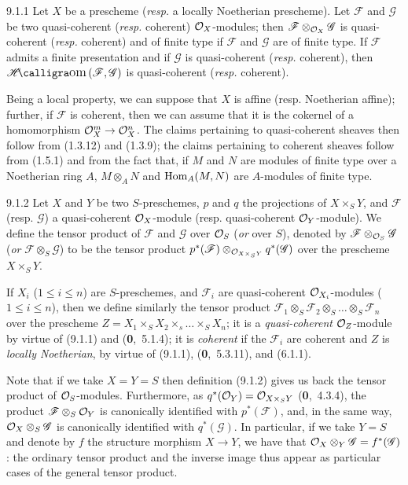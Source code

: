 \documentclass[../main.tex]{subfiles}
\begin{document}
\begin{cx}[Proposition]{9.1.1}
    Let $X$ be a prescheme (\emph{resp.} a locally Noetherian prescheme).
    Let $\mathscr{F}$ and $\mathscr{G}$ be two quasi-coherent (\emph{resp.} coherent) $\mathcal{O}_X$-modules; then $\mathscr{F}\otimes_{\mathcal{O}_X}\mathscr{G}$ is quasi-coherent (\emph{resp.} coherent) and of finite type if $\mathscr{F}$ and $\mathscr{G}$ are of finite type.
    If $\mathscr{F}$ admits a finite presentation and if $\mathscr{G}$ is quasi-coherent (\emph{resp.} coherent), then $\sheafHom(\mathscr{F},\mathscr{G})$ is quasi-coherent (\emph{resp.} coherent).
\end{cx}

Being a local property, we can suppose that $X$ is affine (resp. Noetherian affine); further, if $\mathscr{F}$ is coherent, then we can assume that it is the cokernel of a homomorphism $\mathcal{O}_X^m\to\mathcal{O}_X^n$.
The claims pertaining to quasi-coherent sheaves then follow from (1.3.12) and (1.3.9); the claims pertaining to coherent sheaves follow from (1.5.1) and from the fact that, if $M$ and $N$ are modules of finite type over a Noetherian ring $A$, $M\otimes_A N$ and $\operatorname*{Hom}_A(M,N)$ are $A$-modules of finite type.

\begin{cx}[Definition]{9.1.2}
    Let $X$ and $Y$ be two $S$-preschemes, $p$ and $q$ the projections of $X\times_S Y$, and $\mathscr{F}$ (resp. $\mathscr{G}$) a quasi-coherent $\mathcal{O}_X$-module (resp. quasi-coherent $\mathcal{O}_Y$-module).
    We define the tensor product of $\mathscr{F}$ and $\mathscr{G}$ over $\mathcal{O}_S$ (\emph{or} over $S$), denoted by $\mathscr{F}\otimes_{\mathcal{O}_S}\mathscr{G}$ (\emph{or} $\mathscr{F}\otimes_S\mathscr{G}$) to be the tensor product $p^*(\mathscr{F})\otimes_{\mathcal{O}_{X\times_S Y}}q^*(\mathscr{G})$ over the prescheme $X\times_S Y$.
\end{cx}

If $X_i$ ($1\leqslant i\leqslant n$) are $S$-preschemes, and $\mathscr{F}_i$ are quasi-coherent $\mathcal{O}_{X_i}$-modules ($1\leqslant i\leqslant n$), then we define similarly the tensor product $\mathscr{F}_1\otimes_S\mathscr{F}_2\otimes_S\ldots\otimes_S\mathscr{F}_n$ over the prescheme $Z=X_1\times_S X_2\times_s\ldots\times_S X_n$; it is a \emph{quasi-coherent} $\mathcal{O}_Z$-module by virtue of (9.1.1) and (\textbf{0},~5.1.4); it is \emph{coherent} if the $\mathscr{F}_i$ are coherent and $Z$ is \emph{locally Noetherian}, by virtue of (9.1.1), (\textbf{0},~5.3.11), and (6.1.1).

Note that if we take $X=Y=S$ then definition (9.1.2) gives us back the tensor product of $\mathcal{O}_S$-modules.
Furthermore, as $q^*(\mathcal{O}_Y)=\mathcal{O}_{X\times_S Y}$ (\textbf{0},~4.3.4), the product $\mathscr{F}\otimes_S\mathcal{O}_Y$ is canonically identified with $p^*(\mathscr{F})$, and, in the same way, $\mathcal{O}_X\otimes_S\mathscr{G}$ is canonically identified with $q^*(\mathscr{G})$.
In particular, if we take $Y=S$ and denote by $f$ the structure morphism $X\to Y$, we have that $\mathcal{O}_X\otimes_Y\mathscr{G}=f^*(\mathscr{G})$: the ordinary tensor product and the inverse image thus appear as particular cases of the general tensor product.
\end{document}
